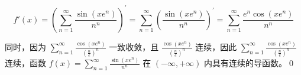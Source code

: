 \begin{equation*}
f'( x) =\left(\sum _{n=1}^{\infty }\frac{\sin\left( xe^{n}\right)}{n^{n}}\right)^{'} =\sum _{n=1}^{\infty }\left(\frac{\sin\left( xe^{n}\right)}{n^{n}}\right)^{'} =\sum _{n=1}^{\infty }\frac{e^{n}\cos\left( xe^{n}\right)}{n^{n}}
\end{equation*}


同时，因为 $\displaystyle \sum _{n=1}^{\infty }\frac{\cos\left( xe^{n}\right)}{\left(\frac{n}{e}\right)^{n}}$ 一致收敛，且 $\displaystyle \frac{\cos\left( xe^{n}\right)}{\left(\frac{n}{e}\right)^{n}}$ 连续，因此 $\displaystyle \sum _{n=1}^{\infty }\frac{\cos\left( xe^{n}\right)}{\left(\frac{n}{e}\right)^{n}}$ 连续，函数 $\displaystyle f( x) =\sum _{n=1}^{\infty }\frac{\sin\left( xe^{n}\right)}{n^{n}}$ 在 $\displaystyle ( -\infty ,+\infty )$ 内具有连续的导函数。\qed 





\ifx\allfiles\undefined

\fi